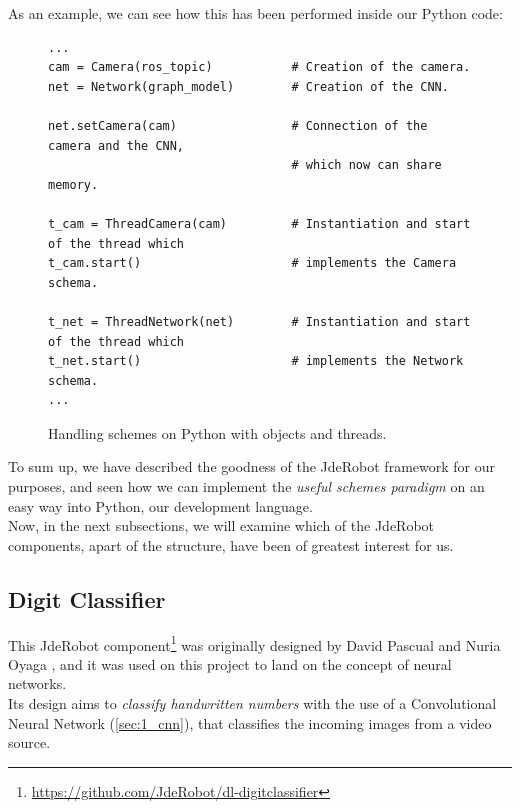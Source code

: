 \begin{itemize}
		As an example, we can see how this has been performed inside our Python code:
		
		\begin{figure}[h]
			\centering
			\begin{lstlisting}
...
cam = Camera(ros_topic)           # Creation of the camera.
net = Network(graph_model)        # Creation of the CNN.

net.setCamera(cam)                # Connection of the camera and the CNN,
                                  # which now can share memory.

t_cam = ThreadCamera(cam)         # Instantiation and start of the thread which
t_cam.start()                     # implements the Camera schema.

t_net = ThreadNetwork(net)        # Instantiation and start of the thread which
t_net.start()                     # implements the Network schema.
...
			\end{lstlisting}
			\caption{Handling schemes on Python with objects and threads.}
			\label{fig:3_schemes_python}
		\end{figure}
	\end{itemize}
	
	\vspace{0.4in}
	
	To sum up, we have described the goodness of the JdeRobot framework for our purposes, and seen how we can implement the \textit{useful schemes paradigm} on an easy way into Python, our development language.\\
	
	Now, in the next subsections, we will examine which of the JdeRobot components, apart of the structure, have been of greatest interest for us.
	
	\subsection{Digit Classifier}
	\label{sec:3_digitclassifier_jderobot}
		This JdeRobot component\footnote{\url{https://github.com/JdeRobot/dl-digitclassifier}} was originally designed by David Pascual \cite{dpascualhe} and Nuria Oyaga \cite{noyaga}, and it was used on this project to land on the concept of neural networks.\\
		
		Its design aims to \textit{classify handwritten numbers} with the use of a Convolutional Neural Network (\autoref{sec:1_cnn}), that classifies the incoming images from a video source.\\
		
